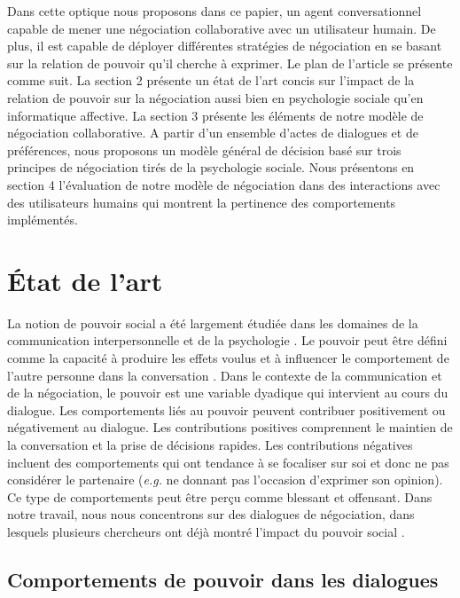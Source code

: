 	Dans cette optique nous proposons dans ce papier, un agent conversationnel capable de mener une négociation collaborative avec un utilisateur humain. De plus, il est capable de déployer différentes stratégies de négociation en se basant sur la relation de pouvoir qu'il cherche à exprimer. Le plan de l'article se présente comme suit. La section 2 présente un état de l'art concis sur l'impact de la relation de pouvoir sur la négociation aussi bien en psychologie sociale qu'en informatique affective.  La section 3 présente les éléments de notre modèle de négociation collaborative. A partir d'un ensemble d'actes de dialogues et de préférences, nous proposons un modèle général de décision basé sur trois principes de négociation tirés de la psychologie sociale. Nous présentons en section 4 l'évaluation de notre modèle de négociation dans des interactions avec des utilisateurs humains qui montrent la pertinence des comportements implémentés. 
	
	\section{État de l'art}
		La notion de pouvoir social a été largement étudiée dans les domaines de la communication interpersonnelle et de la psychologie \cite{kecskes2013research}. Le pouvoir peut être défini comme la capacité à produire les effets voulus et à influencer le comportement de l'autre personne dans la conversation \cite {dunbar2005perceptions}. Dans le contexte de la communication et de la négociation, le pouvoir est une variable dyadique qui intervient au cours du dialogue.
		Les comportements liés au pouvoir peuvent contribuer positivement ou négativement au dialogue. Les contributions positives comprennent le maintien de la conversation et la prise de décisions rapides. Les contributions négatives incluent des comportements qui ont tendance à se focaliser sur soi et donc ne pas considérer le partenaire (\emph {e.g.} ne donnant pas l'occasion d'exprimer son opinion). Ce type de comportements peut être perçu comme blessant et offensant. Dans notre travail, nous nous concentrons sur des dialogues de négociation, dans lesquels plusieurs chercheurs ont déjà montré l'impact du pouvoir social \cite {de2004influence, burgoonnonverbal}.
	
		\subsection{Comportements de pouvoir dans les dialogues}
		\label{sec:domDialogue}
	

